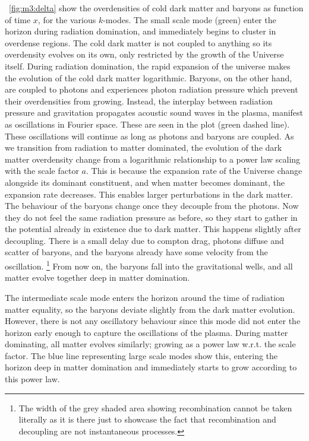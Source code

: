     ~\cref{fig:m3:delta} show the overdensities of cold dark matter and baryons as function of time $x$, for the various $k$-modes. The small scale mode (green) enter the horizon during radiation domination, and immediately begins to cluster in overdense regions. The cold dark matter is not coupled to anything so its overdensity evolves on its own, only restricted by the growth of the Universe itself. During radiation domination, the rapid expansion of the universe makes the evolution of the cold dark matter logarithmic. Baryons, on the other hand, are coupled to photons and experiences photon radiation pressure which prevent their overdensities from growing. Instead, the interplay between radiation pressure and gravitation propagates acoustic sound waves in the plasma, manifest as oscillations in Fourier space. These are seen in the plot (green dashed line). These oscillations will continue as long as photons and baryons are coupled. As we transition from radiation to matter dominated, the evolution of the dark matter overdensity change from a logarithmic relationship to a power law scaling with the scale factor $a$. This is because the expansion rate of the Universe change alongside its dominant constituent, and when matter becomes dominant, the expansion rate decreases. This enables larger perturbations in the dark matter. The behaviour of the baryons change once they decouple from the photons. Now they do not feel the same radiation pressure as before, so they start to gather in the potential already in existence due to dark matter. This happens slightly after decoupling. There is a small delay due to compton drag, photons diffuse and scatter of baryons, and the baryons already have some velocity from the oscillation. \footnote{The width of the grey shaded area showing recombination cannot be taken literally as it is there just to showcase the fact that recombination and decoupling are not instantaneous processes.} From now on, the baryons fall into the gravitational wells, and all matter evolve together deep in matter domination. 

    The intermediate scale mode enters the horizon around the time of radiation matter equality, so the baryons deviate slightly from the dark matter evolution. However, there is not any oscillatory behaviour since this mode did not enter the horizon early enough to capture the oscillations of the plasma. During matter dominating, all matter evolves similarly; growing as a power law w.r.t. the scale factor. The blue line representing large scale modes show this, entering the horizon deep in matter domination and immediately starts to grow according to this power law. 
    


